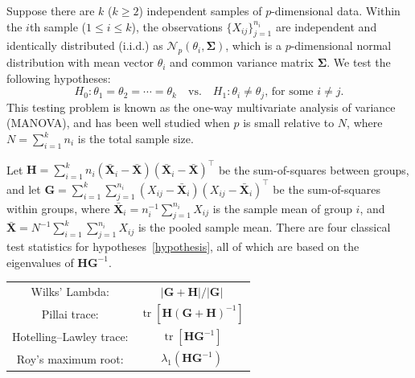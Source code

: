 \documentclass[12pt]{article} %
\DeclareMathOperator{\mytr}{tr}
\newcommand{\bX}{\mathbf{X}}
\newcommand{\bH}{\mathbf{H}}
\newcommand{\bG}{\mathbf{G}}
\newcommand{\bfsym}[1]{\ensuremath{\boldsymbol{#1}}}
\def\bSigma {\bfsym {\Sigma}}
\theoremstyle{definition}
\begin{document}
Suppose there are $k$ ($k\geq 2$) independent samples of $p$-dimensional data.
Within the $i$th sample ($1\leq i\leq k$), the observations $\{X_{ij}\}_{j=1}^{n_i}$ are independent and identically distributed (i.i.d.) as $\mathcal{N}_p(\theta_i,\bSigma)$, which is a $p$-dimensional normal distribution with mean vector $\theta_i$ and common variance matrix $\bSigma$.
We test the following hypotheses:
\begin{equation}\label{hypothesis}
    H_0: \theta_1=\theta_2=\cdots=\theta_k\quad \text{vs.}\quad　H_1: \text{$\theta_i\neq \theta_j$, for some $i\neq j$}.
\end{equation}
This testing problem is known as the one-way multivariate analysis of variance (MANOVA), and has been well studied when $p$ is small relative to $N$, where $N=\sum_{i=1}^k n_i$ is the total sample size.

Let $\bH=\sum_{i=1}^k n_i (\bar{\bX}_i-\bar{\bX})(\bar{\bX}_i-\bar{\bX})^\top$ be the sum-of-squares between groups, and let $\bG=\sum_{i=1}^k \sum_{j=1}^{n_i}(X_{ij}-\bar{\bX}_i)(X_{ij}-\bar{\bX}_i)^\top$ be the sum-of-squares within groups, where $\bar{\bX}_i=n_i^{-1}\sum_{j=1}^{n_i}X_{ij}$ is the sample mean of group $i$, and $\bar{\bX}=N^{-1}\sum_{i=1}^k\sum_{j=1}^{n_i}X_{ij}$ is the pooled sample mean.
   There are four classical test statistics for hypotheses~\eqref{hypothesis}, all of which are based on the eigenvalues of $\bH\bG^{-1}$. 


       \begin{center}
       \begin{tabular}{|cc|}
           \hline
       {Wilks' Lambda:} & $|\bG+\bH|/|\bG|$\\
       {Pillai trace:} & $\mytr[\bH(\bG+\bH)^{-1}]$\\
       {Hotelling--Lawley trace:} & $\mytr[\bH \bG^{-1}]$\\
       {Roy's maximum root:} & $\lambda_{1}(\bH \bG^{-1})$\\
           \hline
           \end{tabular}
       \end{center}
\end{document}
